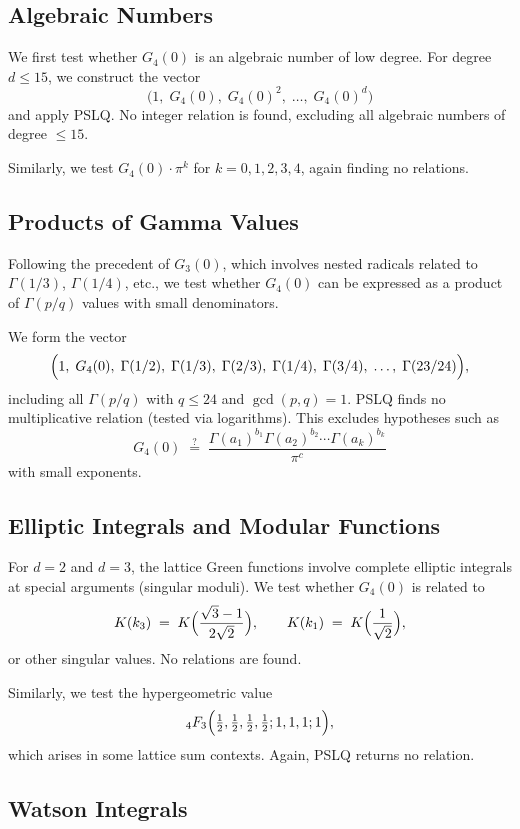 \documentclass[12pt,a4paper]{article}
\numberwithin{equation}{section}
\theoremstyle{plain}
\theoremstyle{definition}
\theoremstyle{remark}
\newcommand{\half}{\tfrac{1}{2}}
\begin{document}
\subsection{Algebraic Numbers}

We first test whether $G_4(0)$ is an algebraic number of low degree. For degree $d \leq 15$,
we construct the vector
\[
  \bigl(1,\; G_4(0),\; G_4(0)^2,\; \ldots,\; G_4(0)^d\bigr)
\]
and apply PSLQ. No integer relation is found, excluding all algebraic numbers of degree $\leq 15$.

Similarly, we test $G_4(0) \cdot \pi^k$ for $k = 0, 1, 2, 3, 4$, again finding no relations.

\subsection{Products of Gamma Values}

Following the precedent of $G_3(0)$, which involves nested radicals related to $\Gamma(1/3)$, $\Gamma(1/4)$, etc.,
we test whether $G_4(0)$ can be expressed as a product of $\Gamma(p/q)$ values with small denominators.

We form the vector
\[
  \Bigl(1,\; G_4(0),\; \Gamma(1/2),\; \Gamma(1/3),\; \Gamma(2/3),\; \Gamma(1/4),\; \Gamma(3/4),\; \ldots,\; \Gamma(23/24)\Bigr),
\]
including all $\Gamma(p/q)$ with $q \leq 24$ and $\gcd(p, q) = 1$. PSLQ finds no multiplicative relation
(tested via logarithms). This excludes hypotheses such as
\[
  G_4(0) \;\stackrel{?}{=}\; \frac{\Gamma(a_1)^{b_1} \Gamma(a_2)^{b_2} \cdots \Gamma(a_k)^{b_k}}{\pi^c}
\]
with small exponents.

\subsection{Elliptic Integrals and Modular Functions}

For $d = 2$ and $d = 3$, the lattice Green functions involve complete elliptic integrals at
special arguments (singular moduli). We test whether $G_4(0)$ is related to
\[
  K(k_3) \;=\; K\Bigl(\frac{\sqrt{3}-1}{2\sqrt{2}}\Bigr), \qquad
  K(k_1) \;=\; K\Bigl(\frac{1}{\sqrt{2}}\Bigr),
\]
or other singular values. No relations are found.

Similarly, we test the hypergeometric value
\[
  {}_4F_3\Bigl(\half,\half,\half,\half; 1, 1, 1; 1\Bigr),
\]
which arises in some lattice sum contexts. Again, PSLQ returns no relation.

\subsection{Watson Integrals}
\end{document}
